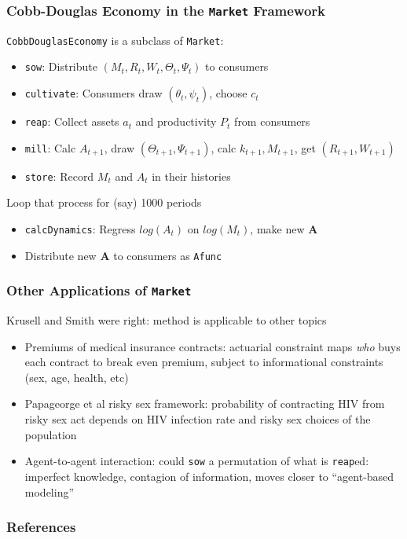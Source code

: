 \documentclass[public]{beamer}\beamerdefaultoverlayspecification{<+->}
\begin{document}
\begin{frame}
  \frametitle{Cobb-Douglas Economy in the \texttt{Market} Framework}

  \texttt{CobbDouglasEconomy} is a subclass of \texttt{Market}:

  \begin{itemize}
  \item \texttt{sow}: Distribute $(M_t,R_t,W_t,\Theta_t,\Psi_t)$ to consumers

  \item \texttt{cultivate}: Consumers draw $(\theta_t,\psi_t)$, choose $c_t$

  \item \texttt{reap}: Collect assets $a_t$ and productivity $P_t$ from consumers

  \item \texttt{mill}: Calc $A_{t+1}$, draw $(\Theta_{t+1},\Psi_{t+1})$, calc $k_{t+1}, M_{t+1}$, get $(R_{t+1},W_{t+1})$

  \item \texttt{store}: Record $M_t$ and $A_t$ in their histories
  \end{itemize}

  Loop that process for (say) 1000 periods
  \begin{itemize}
  \item \texttt{calcDynamics}: Regress $log(A_t)$ on $log(M_t)$, make new \textbf{A}

  \item Distribute new \textbf{A} to consumers as \texttt{Afunc}
  \end{itemize}
\end{frame}



\begin{frame}
  \frametitle{Other Applications of \texttt{Market}}
  Krusell and Smith were right: method is applicable to other topics

  \begin{itemize}
  \item <1->Premiums of medical insurance contracts: actuarial constraint maps \textit{who} buys each contract to break even premium, subject to informational constraints (sex, age, health, etc)

  \item <2->Papageorge et al risky sex framework: probability of contracting HIV from risky sex act depends on HIV infection rate and risky sex choices of the population

  \item <3->Agent-to-agent interaction: could \texttt{sow} a permutation of what is \texttt{reap}ed: imperfect knowledge, contagion of information, moves closer to ``agent-based modeling''
  \end{itemize} 

  \hyperlink{DiscussionTopics}{}

\end{frame}


\beamerdefaultoverlayspecification{<*>}

\begin{frame}[t,allowframebreaks]
  \frametitle{References}
  \tiny 
  
\end{frame}
\pagebreak
\end{document}
